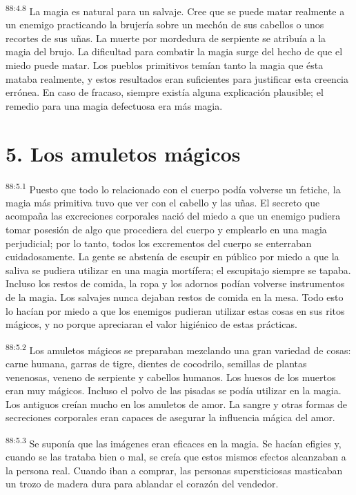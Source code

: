\documentclass[twoside, 11pt]{book}
\begin{document}
\par
\textsuperscript{88:4.8} La magia es natural para un salvaje. Cree que se puede matar realmente a un enemigo practicando la brujería sobre un mechón de sus cabellos o unos recortes de sus uñas. La muerte por mordedura de serpiente se atribuía a la magia del brujo. La dificultad para combatir la magia surge del hecho de que el miedo puede matar. Los pueblos primitivos temían tanto la magia que ésta mataba realmente, y estos resultados eran suficientes para justificar esta creencia errónea. En caso de fracaso, siempre existía alguna explicación plausible; el remedio para una magia defectuosa era más magia.

\section*{5. Los amuletos mágicos}
\par
\textsuperscript{88:5.1} Puesto que todo lo relacionado con el cuerpo podía volverse un fetiche, la magia más primitiva tuvo que ver con el cabello y las uñas. El secreto que acompaña las excreciones corporales nació del miedo a que un enemigo pudiera tomar posesión de algo que procediera del cuerpo y emplearlo en una magia perjudicial; por lo tanto, todos los excrementos del cuerpo se enterraban cuidadosamente. La gente se abstenía de escupir en público por miedo a que la saliva se pudiera utilizar en una magia mortífera; el escupitajo siempre se tapaba. Incluso los restos de comida, la ropa y los adornos podían volverse instrumentos de la magia. Los salvajes nunca dejaban restos de comida en la mesa. Todo esto lo hacían por miedo a que los enemigos pudieran utilizar estas cosas en sus ritos mágicos, y no porque apreciaran el valor higiénico de estas prácticas.

\par
\textsuperscript{88:5.2} Los amuletos mágicos se preparaban mezclando una gran variedad de cosas: carne humana, garras de tigre, dientes de cocodrilo, semillas de plantas venenosas, veneno de serpiente y cabellos humanos. Los huesos de los muertos eran muy mágicos. Incluso el polvo de las pisadas se podía utilizar en la magia. Los antiguos creían mucho en los amuletos de amor. La sangre y otras formas de secreciones corporales eran capaces de asegurar la influencia mágica del amor.

\par
\textsuperscript{88:5.3} Se suponía que las imágenes eran eficaces en la magia. Se hacían efigies y, cuando se las trataba bien o mal, se creía que estos mismos efectos alcanzaban a la persona real. Cuando iban a comprar, las personas supersticiosas masticaban un trozo de madera dura para ablandar el corazón del vendedor.
\end{document}
